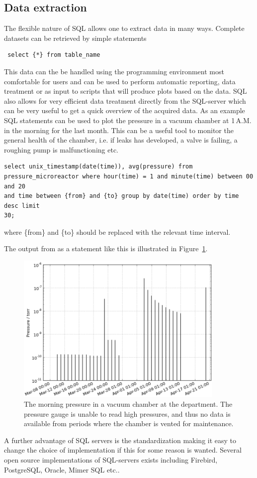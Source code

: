 \subsection{Data extraction} 
The flexible nature of SQL allows one to extract data in many
ways. Complete datasets can be retrieved by simple statements 

\begin{verbatim}
 select {*} from table_name
\end{verbatim}

This data can the be handled using the programming environment most comfortable
for users and can be used to perform automatic reporting, data treatment or as
input to scripts that will produce plots based on the data. SQL also allows for
very efficient data treatment directly from the SQL-server which can be very
useful to get a quick overview of the acquired data. As an example SQL
statements can be used to plot the pressure in a vacuum chamber at 1\,A.M. in
the morning for the last month. This can be a useful tool to monitor the
general health of the chamber, i.e. if leaks has developed, a valve is
failing, a roughing pump is malfunctioning etc.

\begin{verbatim} 
select unix_timestamp(date(time)), avg(pressure) from
pressure_microreactor where hour(time) = 1 and minute(time) between 00 and 20
and time between {from} and {to} group by date(time) order by time desc limit
30; 
\end{verbatim}
where \{from\}  and \{to\} should be replaced with the
relevant time interval.

The output from as a statement like this is illustrated in
Figure~\ref{fig:morning_pressure}.
\begin{figure}
 \begin{center}
 \includegraphics[width=10cm]{morning_pressure.png}
 \caption{ The morning pressure in a vacuum chamber at the department. The
   pressure gauge is unable to read high pressures, and thus no data is
   available from periods where the chamber is vented for maintenance.
   \label{fig:morning_pressure}
 } 
 \end{center}
\end{figure}

A further advantage of SQL servers is the standardization making it easy to
change the choice of implementation if this for some reason is wanted. Several
open source implementations of SQL-servers exists including Firebird,
PostgreSQL, Oracle, Mimer SQL etc..



